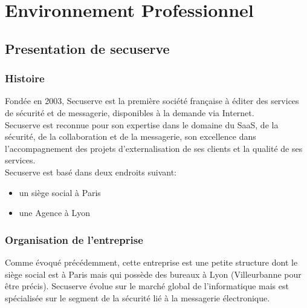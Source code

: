 \section{Environnement Professionnel }
\subsection{Presentation de secuserve}
\subsubsection{Histoire}
Fondée en 2003, Secuserve est la première société française à éditer des services de sécurité et de messagerie, disponibles à la demande via Internet.\\
Secuserve est reconnue pour son expertise dans le domaine du SaaS, de la sécurité, de la collaboration et de la messagerie, son excellence dans l’accompagnement des projets d’externalisation de ses clients et la qualité de ses services.\\
Secuserve est basé dans deux endroits suivant: 
\begin{itemize}
\item un siège social à Paris 
\item une Agence à Lyon
\end{itemize}

\subsubsection{Organisation de l'entreprise}
Comme évoqué précédemment, cette entreprise est une petite structure dont le siège social est à Paris mais qui possède des bureaux à Lyon (Villeurbanne pour être précis). 
Secuserve évolue sur le marché global de l’informatique mais est spécialisée sur le segment de la sécurité lié à la messagerie électronique.
